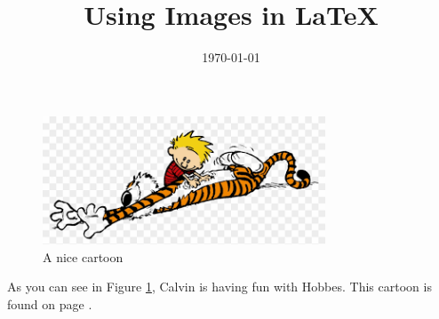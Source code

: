 \documentclass{article}
\begin{document}
\title{Using Images in \LaTeX}
\date{\today}

\maketitle

\begin{figure}[h]
    \centering %
    \includegraphics[width=0.75\textwidth]{calvin} %
    \caption{A nice cartoon} %
    \label{fig:calvin} %
\end{figure}

As you can see in Figure \ref{fig:calvin}, Calvin is having fun with Hobbes. This cartoon is found on page \pageref{fig:calvin}.
\end{document}
